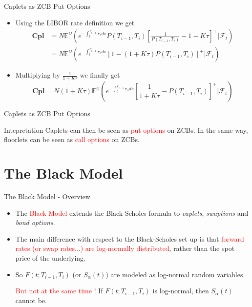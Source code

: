 \documentclass{beamer}
\begin{document}
\begin{frame}{Caplets as ZCB Put Options}
	\begin{itemize}
		\item<1-> Using the LIBOR rate definition we get
		\begin{equation*}
			\begin{aligned}
				\textbf{Cpl} &=N\mathbb{E}^{\mathcal{Q}}\left(e^{-\int_t^{T_{i-1}}r_s ds}P(T_{i-1},T_i)\left[\frac{1}{P(T_{i-1},T_i)}-1-K\tau\right]^+ | \mathcal{F}_t\right) \\
				& = 		N\mathbb{E}^{\mathcal{Q}}\left(e^{-\int_t^{T_{i-1}}r_s ds}\left[1-(1+K\tau)P(T_{i-1},T_i)\right]^+ | \mathcal{F}_t\right)
			\end{aligned}
		\end{equation*}
		\item<2-> Multiplying by $\frac{1}{1+K\tau}$ we finally get
		\begin{equation}
			\textbf{Cpl}=N(1+K\tau)\mathbb{E}^{\mathcal{Q}}\left(e^{-\int_t^{T_{i-1}}r_s ds}\left[\frac{1}{1+K\tau}-P(T_{i-1},T_i)\right]^+ | \mathcal{F}_t\right)
		\end{equation}
	\end{itemize}
\end{frame}

\begin{frame}{Caplets as ZCB Put Options}
	\begin{block}{Intepretation}
		Caplets can then be seen as \textcolor{red}{put options} on ZCBs. In the same way, floorlets can be seen as \textcolor{red}{call options} on ZCBs.
	\end{block}
\end{frame}

\section{The Black Model}
\begin{frame}{The Black Model - Overview}
	\begin{itemize}
		\item The \textcolor{red}{Black Model} extends the Black-Scholes formula to \emph{caplets}, \emph{swaptions} and \emph{bond options}. %
		\item The main difference with respect to the Black-Scholes set up is that \textcolor{red}{forward rates (or swap rates...) are log-normally distributed}, rather than the spot price of the underlying.
		\item So $F(t;T_{i-1},T_i)$ (or $S_\alpha(t)$) are modeled as log-normal random variables. 
		
		\textcolor{red}{But not at the same time !} If $F(t;T_{i-1},T_i)$ is log-normal, then $S_\alpha(t)$ cannot be.
		
	\end{itemize}
\end{frame}
\end{document}
